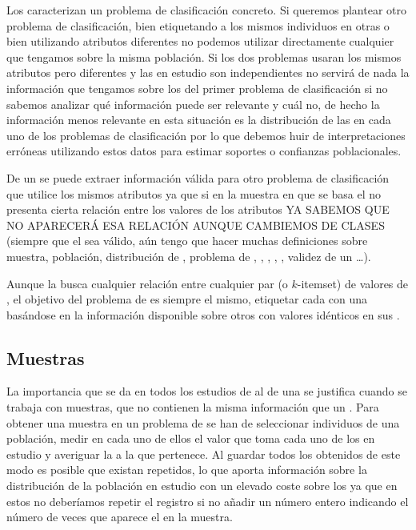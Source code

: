 Los \catalogos caracterizan un problema de clasificación concreto. Si queremos plantear otro problema de clasificación, bien etiquetando a los mismos individuos en otras \clases o bien utilizando atributos diferentes no podemos utilizar directamente cualquier \catalogos que tengamos sobre la misma población. Si los dos problemas usaran los mismos atributos pero diferentes \clases y las \clases en estudio son independientes no servirá de nada la información que tengamos sobre los \sCCs del primer problema de clasificación si no sabemos analizar qué información puede ser relevante y cuál no, de hecho la información menos relevante en esta situación es la distribución de las \clases en cada uno de los problemas de clasificación por lo que debemos huir de interpretaciones erróneas utilizando estos datos para estimar soportes o confianzas poblacionales.

De un \catalogos se puede extraer información válida para otro problema de clasificación que utilice los mismos atributos ya que si en la muestra en que se basa el \catalogos no presenta cierta relación entre los valores de los atributos YA SABEMOS QUE NO APARECERÁ ESA RELACIÓN AUNQUE CAMBIEMOS DE CLASES (siempre que el \catalogos sea válido, aún tengo que hacer muchas definiciones sobre muestra, población, distribución de \clases, problema de \clasificacion, \atributos, \clases, \catalogos, \sCCs, validez de un \catalogos\ldots).

Aunque la \ARM busca cualquier relación entre cualquier par (o $k$-itemset) de valores de \D, el objetivo del problema de \clasificacion es siempre el mismo, etiquetar cada \registro con una \clase basándose en la información disponible sobre otros \registros con valores idénticos en sus \atributos.





\subsection{Muestras}
\label{sec:clasificacion:catalogo:muestras}
La importancia que se da en todos los estudios de \ARM al \soporte de una \ar se justifica cuando se trabaja con muestras, que no contienen la misma información que un \catalogo. Para obtener una muestra en un problema de \clasificacion se han de seleccionar individuos de una población, medir en cada uno de ellos el valor que toma cada uno de los \atributos en estudio y averiguar la \clase a la que pertenece. Al guardar todos los \registros obtenidos de este modo es posible que existan \registros repetidos, lo que aporta información sobre la distribución de la población en estudio con un elevado coste sobre los \catalogos ya que en estos no deberíamos repetir el registro si no añadir un número entero indicando el número de veces que aparece el \registro en la muestra.


